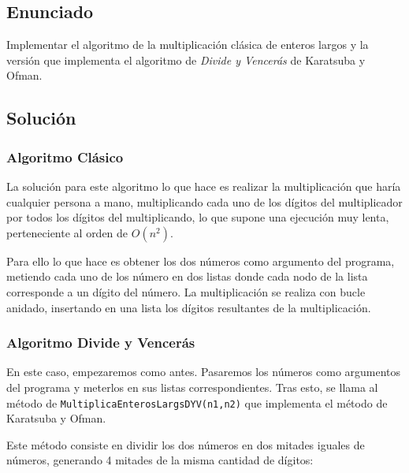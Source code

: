 \documentclass[10pt,a4paper,spanish]{report}
\theoremstyle{definition}
\theoremstyle{remark}
\begin{document}
\subsection{\textcolor[rgb]{0.1,0.2,1}Enunciado}

Implementar el algoritmo de la multiplicación clásica de enteros largos y la versión que implementa el algoritmo de \textit{\textcolor[rgb]{0.1,0.2,1}{Divide y Vencerás}} de Karatsuba y Ofman.

\subsection{\textcolor[rgb]{0.1,0.2,1}Solución}

\subsubsection{\textcolor[rgb]{0.1,0.2,1}Algoritmo Clásico}

La solución para este algoritmo lo que hace es realizar la multiplicación que haría cualquier persona a mano, multiplicando cada uno de los dígitos del multiplicador por todos los dígitos del multiplicando, lo que supone una ejecución muy lenta, perteneciente al orden de $O(n^2)$.

\begin{center}
  
\end{center}

Para ello lo que hace es obtener los dos números como argumento del programa, metiendo cada uno de los número en dos listas donde cada nodo de la lista corresponde a un dígito del número. La multiplicación se realiza con bucle anidado, insertando en una lista los dígitos resultantes de la multiplicación.


\subsubsection{\textcolor[rgb]{0.1,0.2,1}Algoritmo Divide y Vencerás}

En este caso, empezaremos como antes. Pasaremos los números como argumentos del programa y meterlos en sus listas correspondientes. Tras esto, se llama al método de \verb*|MultiplicaEnterosLargsDYV(n1,n2)| que implementa el método de Karatsuba y Ofman.

Este método consiste en dividir los dos números en dos mitades iguales de números, generando 4 mitades de la misma cantidad de dígitos:
\end{document}
